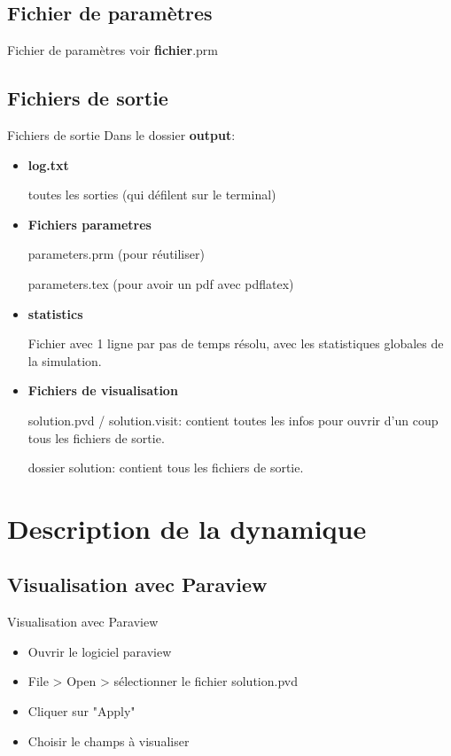 \documentclass[9pt]{beamer}
\begin{document}
\subsection{Fichier de paramètres}
\begin{frame}{Fichier de paramètres}
   voir \textbf{fichier}.prm
   
\end{frame}


\subsection{Fichiers de sortie}
\begin{frame}{Fichiers de sortie}
Dans le dossier \textbf{output}: 
\begin{itemize}
    \item \textbf{log.txt} 
    
    toutes les sorties (qui défilent sur le terminal)
    \item \textbf{Fichiers parametres}
    
    parameters.prm (pour réutiliser)
    
    parameters.tex (pour avoir un pdf avec pdflatex)
    \item \textbf{statistics}
    
    Fichier avec 1 ligne par pas de temps résolu, avec les statistiques globales de la simulation.
    \item \textbf{Fichiers de visualisation}
    
    solution.pvd / solution.visit: contient toutes les infos pour ouvrir d'un coup tous les fichiers de sortie.
    
    dossier solution: contient tous les fichiers de sortie.
\end{itemize}
\end{frame}




\section{Description de la dynamique}

\subsection{Visualisation avec Paraview}


\begin{frame}{Visualisation avec Paraview}
 
 \begin{itemize}
    \item Ouvrir le logiciel paraview
    \item File > Open > sélectionner le fichier solution.pvd
    \item Cliquer sur "Apply"
    \item Choisir le champs à visualiser
\end{itemize}
    
\end{frame}
\end{document}

